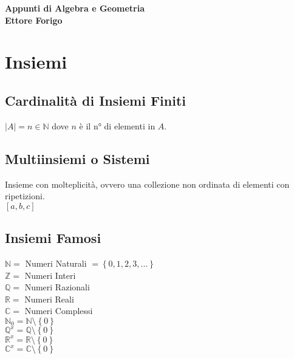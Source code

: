 \documentclass[a4paper, twoside, italian, 11pt]{book}
\newcommand{\braces}[1] {\left\{#1\right\}}
\newcommand{\N}{\mathbb{N}}
\newcommand{\Q}{\mathbb{Q}}
\newcommand{\Z}{\mathbb{Z}}
\newcommand{\R}{\mathbb{R}}
\newcommand{\C}{\mathbb{C}}
\begin{document}
\pagestyle{headings}

\frontmatter

\begin{titlepage}
	\begin{center}
		{\huge \bfseries Appunti di Algebra e Geometria\\}
		\vspace{1.5cm}
		{\Large \bfseries Ettore Forigo}
	\end{center}
\end{titlepage}

\mainmatter


\chapter{Insiemi}



\section{Cardinalità di Insiemi Finiti}

$\left | A \right | = n \in \N$ dove $n$ è il n° di elementi in $A$.



\section{Multiinsiemi o Sistemi}

Insieme con molteplicità, ovvero una collezione non ordinata di elementi con ripetizioni. \\

$[a, b, c]$



\section{Insiemi Famosi}

$\N =$ Numeri Naturali $= \braces{0, 1, 2, 3, ...}$ \\
$\Z =$ Numeri Interi \\
$\Q =$ Numeri Razionali \\
$\R =$ Numeri Reali \\
$\C =$ Numeri Complessi \\
$\N_0 = \N \setminus \braces{0}$ \\
$\Q^x = \Q \setminus \braces{0}$ \\
$\R^x = \R \setminus \braces{0}$ \\
$\C^x = \C \setminus \braces{0}$
\end{document}
